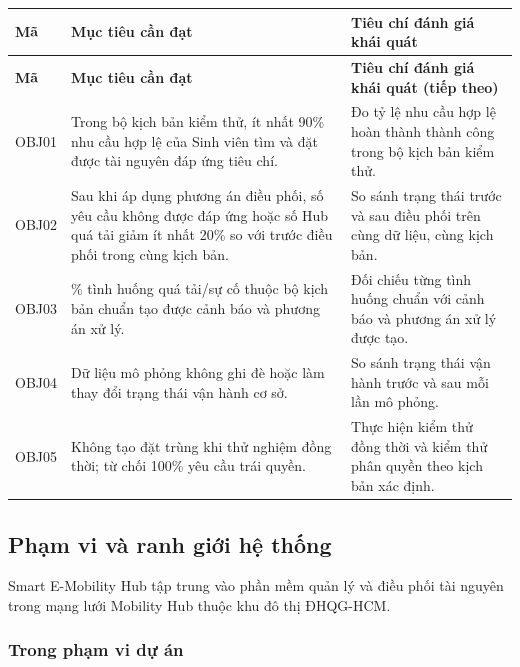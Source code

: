 {
\small
\setlength{\tabcolsep}{3pt}
\renewcommand{\arraystretch}{1.25}
\begin{longtable}{|>{\centering\arraybackslash}p{1.5cm}|>{\raggedright\arraybackslash}p{5.5cm}|>{\raggedright\arraybackslash}p{5.8cm}|}
\hline
\textbf{Mã} & \textbf{Mục tiêu cần đạt} & \textbf{Tiêu chí đánh giá khái quát} \\
\hline
\endfirsthead
\hline
\textbf{Mã} & \textbf{Mục tiêu cần đạt} & \textbf{Tiêu chí đánh giá khái quát (tiếp theo)} \\
\hline
\endhead
OBJ01 & Trong bộ kịch bản kiểm thử, ít nhất 90\% nhu cầu hợp lệ của Sinh viên tìm và đặt được tài nguyên đáp ứng tiêu chí. & Đo tỷ lệ nhu cầu hợp lệ hoàn thành thành công trong bộ kịch bản kiểm thử. \\
\hline
OBJ02 & Sau khi áp dụng phương án điều phối, số yêu cầu không được đáp ứng hoặc số Hub quá tải giảm ít nhất 20\% so với trước điều phối trong cùng kịch bản. & So sánh trạng thái trước và sau điều phối trên cùng dữ liệu, cùng kịch bản. \\
\hline
OBJ03 & 100\% tình huống quá tải/sự cố thuộc bộ kịch bản chuẩn tạo được cảnh báo và phương án xử lý. & Đối chiếu từng tình huống chuẩn với cảnh báo và phương án xử lý được tạo. \\
\hline
OBJ04 & Dữ liệu mô phỏng không ghi đè hoặc làm thay đổi trạng thái vận hành cơ sở. & So sánh trạng thái vận hành trước và sau mỗi lần mô phỏng. \\
\hline
OBJ05 & Không tạo đặt trùng khi thử nghiệm đồng thời; từ chối 100\% yêu cầu trái quyền. & Thực hiện kiểm thử đồng thời và kiểm thử phân quyền theo kịch bản xác định. \\
\hline
\end{longtable}
}

\subsection{Phạm vi và ranh giới hệ thống}

Smart E-Mobility Hub tập trung vào phần mềm quản lý và điều phối tài nguyên trong mạng lưới Mobility Hub thuộc khu đô thị ĐHQG-HCM.

\subsubsection{Trong phạm vi dự án}

